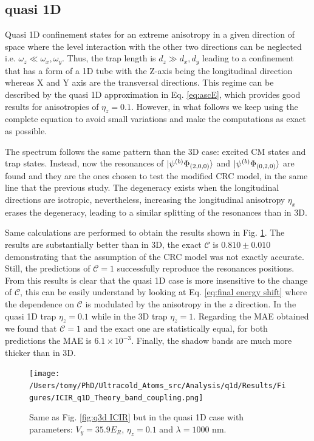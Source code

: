 \documentclass[aps,pre,twocolumn,superscriptaddress,showpacs]{revtex4-1}
\begin{document}
\subsection{quasi 1D} \label{subsec:quasi 1D}
Quasi 1D confinement states for an extreme anisotropy in a given direction of space where the level interaction with the other two directions can be neglected i.e. $\omega_z \ll \omega_x, \omega_y$. Thus, the trap length is $d_z \gg d_x, d_y$ leading to a confinement that has a form of a 1D tube with the Z-axis being the longitudinal direction whereas X and Y axis are the transversal directions. This regime can be described by the quasi 1D approximation in Eq. \eqref{eq:ascE}, which provides good results for anisotropies of $\eta_z = 0.1$. However, in what follows we keep using the complete equation to avoid small variations and make the computations as exact as possible.

The spectrum follows the same pattern than the 3D case: excited CM states and trap states. Instead, now the resonances of $\ket{ \psi^{(b)} \Phi_{(2,0,0)}} $ and $\ket{ \psi^{(b)} \Phi_{(0,2,0)}}$ are found and they are the ones chosen to test the modified CRC model, in the same line that the previous study. The degeneracy exists when the longitudinal directions are isotropic, nevertheless, increasing the longitudinal anisotropy $\eta_x$ erases the degeneracy, leading to a similar splitting of the resonances than in 3D.

Same calculations are performed to obtain the results shown in Fig. \ref{fig:q1D ICIR}. The results are substantially better than in 3D, the exact $\mathcal{C}$ is $0.810 \pm 0.010$ demonstrating that the assumption of the CRC model was not exactly accurate. Still, the predictions of $\mathcal{C} = 1$ successfully reproduce the resonances positions. From this results is clear that the quasi 1D case is more insensitive to the change of $\mathcal{C}$, this can be easily understand by looking at Eq. \eqref{eq:final energy shift} where the dependence on $\mathcal{C}$ is modulated by the anisotropy in the $z$ direction. In the quasi 1D trap $\eta_z=0.1$ while in the 3D trap $\eta_z=1$. Regarding the MAE obtained we found that $\mathcal{C}=1$ and the exact one are statistically equal, for both predictions the MAE is $6.1\times 10^{-3}$. Finally, the shadow bands are much more thicker than in 3D.

\begin{figure}[htbp!]
   	 \centering
    	\texttt{[image: /Users/tomy/PhD/Ultracold\_Atoms\_src/Analysis/q1d/Results/Figures/ICIR\_q1D\_Theory\_band\_coupling.png]}
    	\caption{Same as Fig. \ref{fig:q3d ICIR} but in the quasi 1D case with parameters: $V_y = 35.9E_R$, $\eta_z = 0.1$ and $\lambda=1000$ nm. }
    	\label{fig:q1D ICIR}
	\end{figure}
	
\end{document}
